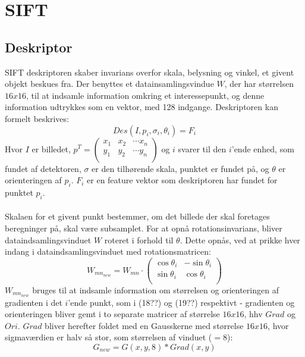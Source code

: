 \section{SIFT}

\subsection{Deskriptor}
SIFT deskriptoren skaber invarians overfor skala, belysning og vinkel, et givent objekt beskues fra. Der benyttes et datainsamlingsvindue $W$, der har størrelsen $16x16$, til at indsamle information omkring et interessepunkt, og denne information udtrykkes som en vektor, med 128 indgange. Deskriptoren kan formelt beskrives:
\begin{equation}
Des(I, p_i,\sigma_i,\theta_i) = F_i
\end{equation}
Hvor $I$ er billedet, 
$p^T = \begin{pmatrix}
	x_1 & x_2 & \cdots x_n \\
	y_1 & y_2 & \cdots y_n \\
\end{pmatrix}$ og $i$ svarer til den $i$'ende enhed, som fundet af detektoren, $\sigma$ er den tilhørende skala, punktet er fundet på, og $\theta$ er orienteringen af $p_i$. $F_i$ er en feature vektor som deskriptoren har fundet for punktet $p_i$.
\\
\\
Skalaen for et givent punkt bestemmer, om det billede der skal foretages beregninger på, skal være subsamplet. For at opnå rotationsinvarians, bliver dataindsamlingsvinduet $W$ roteret i forhold til $\theta$. Dette opnås, ved at prikke hver indang i dataindsamlingsvinduet med rotationsmatricen:
\begin{equation}
W_{{mn}_{new}} = W_{mn} \cdot
\begin{pmatrix}
  \cos \theta_i & -\sin \theta_i \\
  \sin \theta_i & \cos \theta_i  \\
\end{pmatrix}
\end{equation}
$W_{{mn}_{new}}$ bruges til at indsamle information om størrelsen og orienteringen af gradienten i det $i$'ende punkt, som i (18??) og (19??) respektivt - gradienten og orienteringen bliver gemt i to separate matricer af størrelse $16x16$, hhv $Grad$ og $Ori$. $Grad$ bliver herefter foldet med en Gausskerne med størrelse $16x16$, hvor sigmaværdien er halv så stor, som størrelsen af vinduet ($=8$):
\begin{equation}
G_{new} = G(x,y,8) * Grad(x,y)
\end{equation}

